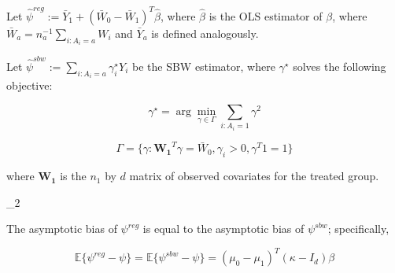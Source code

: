 Let $\hat{\psi}^{reg} := \bar{Y}_1 + (\bar{W}_0 - \bar{W}_1)^T\hat{\beta}$, where $\hat{\beta}$ is the OLS estimator of $\beta$, where $\bar{W}_a = n_a^{-1}\sum_{i:A_i = a} W_i$ and $\bar{Y}_a$ is defined analogously.  

Let $\hat{\psi}^{sbw} := \sum_{i: A_i = a} \gamma_i^\star Y_i$ be the SBW estimator, where $\gamma^\star$ solves the following objective:

$$
\gamma^\star = \arg\min_{\gamma \in \Gamma} \sum_{i: A_i = 1}\gamma^2
$$

$$
\Gamma = \{\gamma: \mathbf{W_1}^T\gamma = \bar{W}_0, \gamma_i > 0, \gamma^T1 = 1\}
$$

where $\mathbf{W_1}$ is the $n_1$ by $d$ matrix of observed covariates for the treated group.

\begin{assumptions}
\lvert \gamma \lvert_2 
\end{assumptions}

\begin{lemma}\label{cl1}
The asymptotic bias of $\psi^{reg}$ is equal to the asymptotic bias of $\psi^{sbw}$; specifically, 

$$
\mathbb{E}\{\psi^{reg} - \psi\} = \mathbb{E}\{\psi^{sbw} - \psi\} = (\mu_0 - \mu_1)^T(\kappa - I_d)\beta
$$
\end{lemma}

